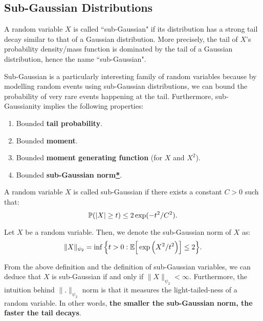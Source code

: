 \subsection{Sub-Gaussian Distributions}
A random variable $X$ is called ``sub-Gaussian" if its distribution has a strong tail decay similar to that of a Gaussian distribution. More precisely, the tail of $X$'s probability density/mass function is dominated by the tail of a Gaussian distribution, hence the name ``sub-Gaussian".

\noindent\newline Sub-Gaussian is a particularly interesting family of random variables because by modelling random events using sub-Gaussian distributions, we can bound the probability of very rare events happening at the tail. Furthermore, sub-Gaussianity implies the following properties:
\begin{enumerate}[label=(\roman*)]
	\item Bounded \textbf{tail probability}.
	\item Bounded \textbf{moment}.
	\item Bounded \textbf{moment generating function} (for $X$ and $X^2$).
	\item Bounded \textbf{sub-Gaussian norm\hyperref[sec:subgaussian_norm]{*}}.
\end{enumerate} 

\begin{definition}
	\label{sec:subgaussian_var}
	A random variable $X$ is called sub-Gaussian if there exists a constant $C>0$ such that:
	\begin{equation}
		\mathbb{P}(|X|\ge t) \le 2\exp(-t^2/C^2).	
	\end{equation} 
\end{definition} 

\begin{definition}
	\label{sec:subgaussian_norm}
	Let $X$ be a random variable. Then, we denote the sub-Gaussian norm of $X$ as:
	\begin{equation}
		\|X\|_{\psi_2} = \inf\Big\{ 
			t > 0: \mathbb{E}\Big[ \exp\Big( X^2/t^2 \Big) \Big] \le 2
		 \Big\}.
	\end{equation} 

	\noindent From the above definition and the definition of sub-Gaussian variables, we can deduce that $X$ is sub-Gaussian if and only if $\|X\|_{\psi_2} < \infty$. Furthermore, the intuition behind $\|.\|_{\psi_2}$ norm is that it measures the light-tailed-ness of a random variable. In other words, \textbf{the smaller the sub-Gaussian norm, the faster the tail decays}.
\end{definition} 

